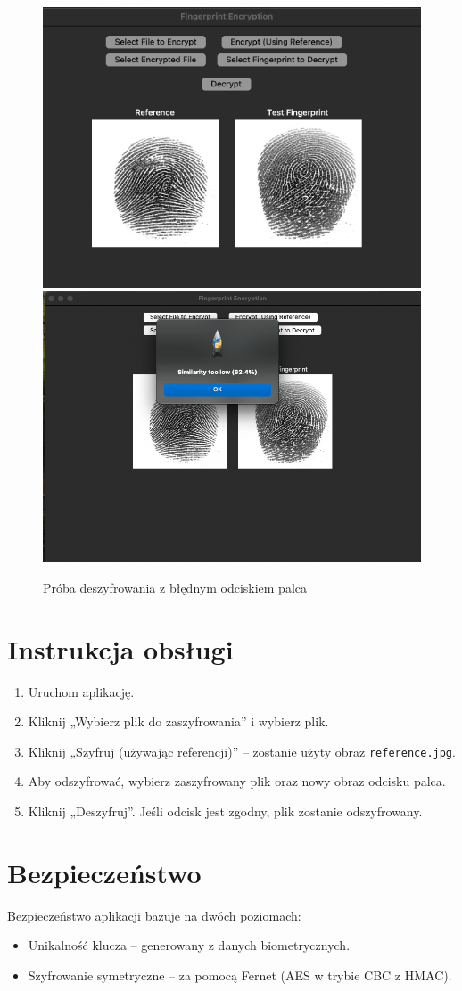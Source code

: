 \documentclass{urdpl}     %
\begin{document}
\begin{figure}[H]
	\centering
	\includegraphics[width=0.49\linewidth]{docs/decryptViaInvalidFingerprint.png}
	\includegraphics[width=0.49\linewidth]{docs/decryptViaInvalidFingerprintNotify.png}
	\caption*{Próba deszyfrowania z błędnym odciskiem palca}
\end{figure}

\section{Instrukcja obsługi}

\begin{enumerate}
	\item Uruchom aplikację.
	\item Kliknij „Wybierz plik do zaszyfrowania” i wybierz plik.
	\item Kliknij „Szyfruj (używając referencji)” – zostanie użyty obraz \texttt{reference.jpg}.
	\item Aby odszyfrować, wybierz zaszyfrowany plik oraz nowy obraz odcisku palca.
	\item Kliknij „Deszyfruj”. Jeśli odcisk jest zgodny, plik zostanie odszyfrowany.
\end{enumerate}

\section{Bezpieczeństwo}

Bezpieczeństwo aplikacji bazuje na dwóch poziomach:
\begin{itemize}
	\item Unikalność klucza – generowany z danych biometrycznych.
	\item Szyfrowanie symetryczne – za pomocą Fernet (AES w trybie CBC z HMAC).
\end{itemize}
\end{document}

